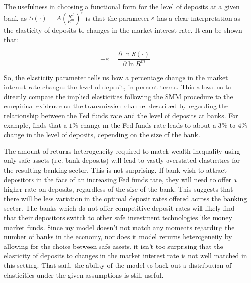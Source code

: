 \par The usefulness in choosing a functional form for the level of deposits at a given bank as $S(\cdot) = A \left( \frac{R^d}{R^m} \right)^{\varepsilon}$ is that the parameter $\varepsilon$ has a clear interpretation as the elasticity of deposits to changes in the market interest rate. It can be shown that:

\[
-\varepsilon = \frac{\partial \ln S(\cdot)}{\partial \ln R^m}. 
\]

\par So, the elasticity parameter tells us how a percentage change in the market interest rate changes the level of deposit, in percent terms. This allows us to directly compare the implied elasticities following the SMM procedure to the emepirical evidence on the transmission channel described by \cite{Drechsler2017} regarding the relationship between the Fed funds rate and the level of deposits at banks. For example, \cite{Genay2004} finds that a $1\%$ change in the Fed funds rate leads to about a  $3\%$ to  $4\%$ change in the level of deposits, depending on the size of the bank.

\par The amount of returns heterogeneity required to match wealth inequality using only safe assets (i.e. bank deposits) will lead to vastly overstated elasticities for the resulting banking sector. This is not surprising. If bank wish to attract depositors in the face of an increasing Fed funds rate, they will need to offer a higher rate on deposits, regardless of the size of the bank. This suggests that there will be less variation in the optimal deposit rates offered across the banking sector. The banks which do not offer competitive deposit rates will likely find that their depositors switch to other safe investment technologies like money market funds. Since my model doesn't not match any moments regarding the number of banks in the economy, nor does it model returns heterogeneity by allowing for the choice between safe assets, it isn't too surprising that the elasticity of deposits to changes in the market interest rate is not well matched in this setting. That said, the ability of the model to back out a distribution of elasticities under the given assumptions is still useful. 
